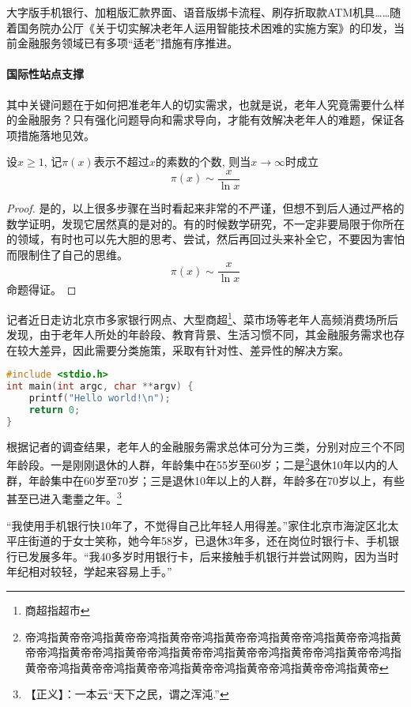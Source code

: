 \documentclass[printMode]{ecnuthesis}
\begin{document}
大字版手机银行、加粗版汇款界面、语音版绑卡流程、刷存折取款ATM机具……随着国务院办公厅《关于切实解决老年人运用智能技术困难的实施方案》的印发，当前金融服务领域已有多项“适老”措施有序推进。

\paragraph{国际性站点支撑}

其中关键问题在于如何把准老年人的切实需求，也就是说，老年人究竟需要什么样的金融服务？只有强化问题导向和需求导向，才能有效解决老年人的难题，保证各项措施落地见效。

\begin{theorem}[素数定理]
  设$x \geqslant 1$, 记$\pi(x)$表示不超过$x$的素数的个数, 则当$x \to \infty$时成立
  \[\pi(x) \sim \frac{x}{\ln x}\]
\end{theorem}

\begin{proof}
  是的，以上很多步骤在当时看起来非常的不严谨，但想不到后人通过严格的数学证明，发现它居然真的是对的。有的时候数学研究，不一定非要局限于你所在的领域，有时也可以先大胆的思考、尝试，然后再回过头来补全它，不要因为害怕而限制住了自己的思维。
  \[\pi(x) \sim \frac{x}{\ln x}\]
  命题得证。
\end{proof}

记者近日走访北京市多家银行网点、大型商超\footnote{商超指超市}、菜市场等老年人高频消费场所后发现，由于老年人所处的年龄段、教育背景、生活习惯不同，其金融服务需求也存在较大差异，因此需要分类施策，采取有针对性、差异性的解决方案。

\begin{lstlisting}[language=C++]
#include <stdio.h>
int main(int argc, char **argv) {
    printf("Hello world!\n");
    return 0;
}
\end{lstlisting}

根据记者的调查结果，老年人的金融服务需求总体可分为三类，分别对应三个不同年龄段。一是刚刚退休的人群，年龄集中在55岁至60岁；二是\footnote{帝鸿指黄帝帝鸿指黄帝帝鸿指黄帝帝鸿指黄帝帝鸿指黄帝帝鸿指黄帝帝鸿指黄帝帝鸿指黄帝帝鸿指黄帝帝鸿指黄帝帝鸿指黄帝帝鸿指黄帝帝鸿指黄帝帝鸿指黄帝帝鸿指黄帝帝鸿指黄帝帝鸿指黄帝帝鸿指黄帝帝鸿指黄帝帝鸿指黄帝}退休10年以内的人群，年龄集中在60岁至70岁；三是退休10年以上的人群，年龄多在70岁以上，有些甚至已进入耄耋之年。\footnote{【正义】：一本云“天下之民，谓之浑沌.”}

“我使用手机银行快10年了，不觉得自己比年轻人用得差。”家住北京市海淀区北太平庄街道的于女士笑称，她今年58岁，已退休3年多，还在岗位时银行卡、手机银行已发展多年。“我40多岁时用银行卡，后来接触手机银行并尝试网购，因为当时年纪相对较轻，学起来容易上手。”
\end{document}
